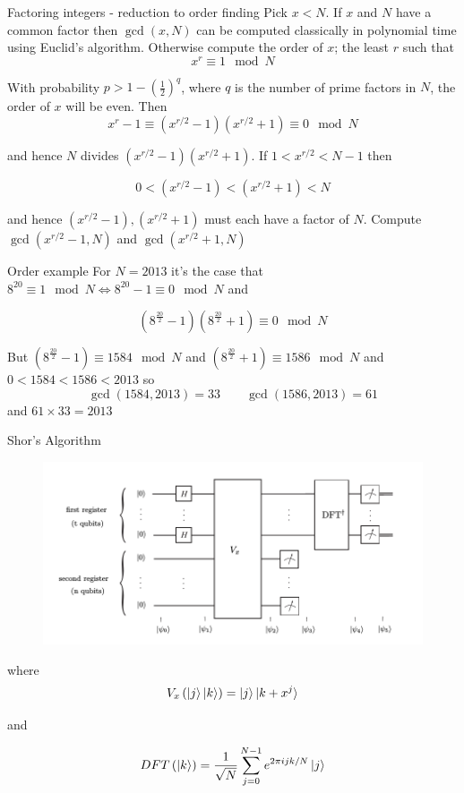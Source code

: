 \documentclass{beamer}
\begin{document}
\begin{frame}{Factoring integers - reduction to order finding}
Pick $x<N$. If $x$ and $N$ have a common factor then $\gcd(x,N)$ can be computed classically in polynomial time using Euclid's algorithm. Otherwise compute the order of $x$; the least $r$ such that
\[
x^r\equiv 1 \mod N
\]

With probability $p>1-\left(\frac{1}{2}\right)^q$, where $q$ is the number of prime factors in $N$, the order of $x$ will be even. Then
\[
x^r-1\equiv \left(x^{r/2}-1\right)\left(x^{r/2}+1\right)\equiv 0 \mod N
\]

and hence $N$ divides $\left(x^{r/2}-1\right)\left(x^{r/2}+1\right)$. If $1<x^{r/2}<N-1$ then 

\[
0<\left(x^{r/2}-1\right)<\left(x^{r/2}+1\right)<N
\]

and hence $\left(x^{r/2}-1\right),\left(x^{r/2}+1\right)$ must each have a factor of $N$. Compute $\gcd(x^{r/2}-1,N)$ and $\gcd(x^{r/2}+1,N)$ 

\end{frame}

\begin{frame}{Order example}
For $N=2013$ it's the case that $8^{20}\equiv 1 \mod N \iff 8^{20}- 1 \equiv 0 \mod N$ and 

\[
\left(8^{\frac{20}{2}}-1\right)\left(8^{\frac{20}{2}}+1\right)\equiv 0 \mod N
\]

But $\left(8^{\frac{20}{2}}-1\right)\equiv 1584 \mod N$ and  $\left(8^{\frac{20}{2}}+1\right)\equiv 1586 \mod N$ and $0<1584<1586<2013$ so 
\[
\gcd \left(1584,2013\right)=33 \qquad \gcd \left(1586,2013\right)=61
\]
 and $61\times 33=2013$

\end{frame}

\begin{frame}{Shor's Algorithm}

\begin{figure}[ht]
  \includegraphics[scale=0.4]{pasted5}
\end{figure}

where 
\[
V_x \left(\ket{j}\ket{k}\right) = \ket{j}\ket{k+x^j}
\]

and

\[
DFT\left(\ket{k}\right) = \frac{1}{\sqrt{N}}\sum_{j=0}^{N-1}e^{2\pi i j k/N}\ket{j}
\]
\end{frame}
\end{document}

